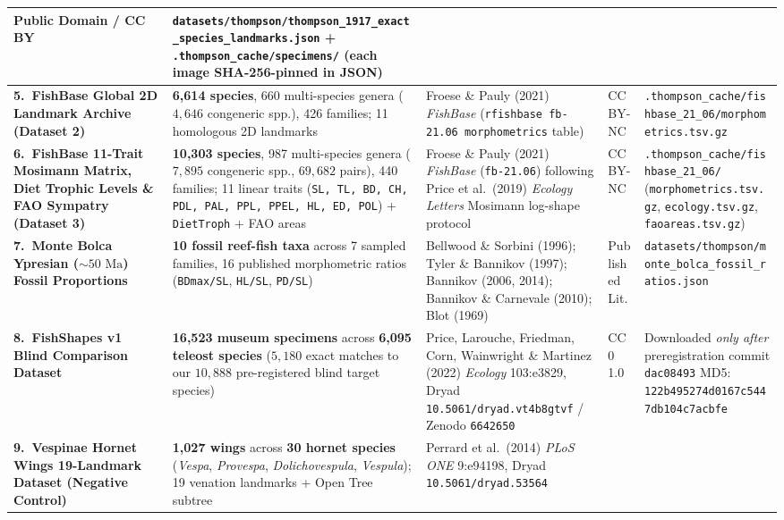 \documentclass[10.5pt,a4paper]{article}
\newcommand{\code}[1]{{\footnotesize\nolinkurl{#1}}}
\begin{document}
{\begin{tabularx}{\textwidth}{L{1.28in} L{1.25in} L{1.35in} L{0.58in} Y}
Public Domain / CC BY &
\code{datasets/thompson/thompson_1917_exact_species_landmarks.json} + \code{.thompson_cache/specimens/} (each image SHA-256-pinned in JSON) \\
\midrule
\textbf{5.\ FishBase Global 2D Landmark Archive (Dataset 2)} &
\textbf{6,614 species}, 660 multi-species genera ($4{,}646$ congeneric spp.), 426 families; 11 homologous 2D landmarks &
Froese \& Pauly (2021) \emph{FishBase} (\code{rfishbase fb-21.06 morphometrics} table) &
CC BY-NC &
\code{.thompson_cache/fishbase_21_06/morphometrics.tsv.gz} \\
\midrule
\textbf{6.\ FishBase 11-Trait Mosimann Matrix, Diet Trophic Levels \& FAO Sympatry (Dataset 3)} &
\textbf{10,303 species}, 987 multi-species genera ($7{,}895$ congeneric spp., $69{,}682$ pairs), 440 families; 11 linear traits (\texttt{SL, TL, BD, CH, PDL, PAL, PPL, PPEL, HL, ED, POL}) + \texttt{DietTroph} + FAO areas &
Froese \& Pauly (2021) \emph{FishBase} (\code{fb-21.06}) following Price et al.\ (2019) \emph{Ecology Letters} Mosimann log-shape protocol &
CC BY-NC &
\code{.thompson_cache/fishbase_21_06/} (\code{morphometrics.tsv.gz}, \code{ecology.tsv.gz}, \code{faoareas.tsv.gz}) \\
\midrule
\textbf{7.\ Monte Bolca Ypresian ($\sim 50\text{ Ma}$) Fossil Proportions} &
\textbf{10 fossil reef-fish taxa} across 7 sampled families, 16 published morphometric ratios (\texttt{BDmax/SL}, \texttt{HL/SL}, \texttt{PD/SL}) &
Bellwood \& Sorbini (1996); Tyler \& Bannikov (1997); Bannikov (2006, 2014); Bannikov \& Carnevale (2010); Blot (1969) &
Published Lit. &
\code{datasets/thompson/monte_bolca_fossil_ratios.json} \\
\midrule
\textbf{8.\ FishShapes v1 Blind Comparison Dataset} &
\textbf{16,523 museum specimens} across \textbf{6,095 teleost species} ($5{,}180$ exact matches to our $10{,}888$ pre-registered blind target species) &
Price, Larouche, Friedman, Corn, Wainwright \& Martinez (2022) \emph{Ecology} 103:e3829, Dryad \code{10.5061/dryad.vt4b8gtvf} / Zenodo \code{6642650} &
CC0 1.0 &
Downloaded \emph{only after} preregistration commit \texttt{dac08493}\newline
MD5: \code{122b495274d0167c5447db104c7acbfe} \\
\midrule
\textbf{9.\ Vespinae Hornet Wings 19-Landmark Dataset (Negative Control)} &
\textbf{1,027 wings} across \textbf{30 hornet species} (\emph{Vespa}, \emph{Provespa}, \emph{Dolichovespula}, \emph{Vespula}); 19 venation landmarks + Open Tree subtree &
Perrard et al.\ (2014) \emph{PLoS ONE} 9:e94198, Dryad \code{10.5061/dryad.53564} &

\end{tabularx}}
\end{document}
